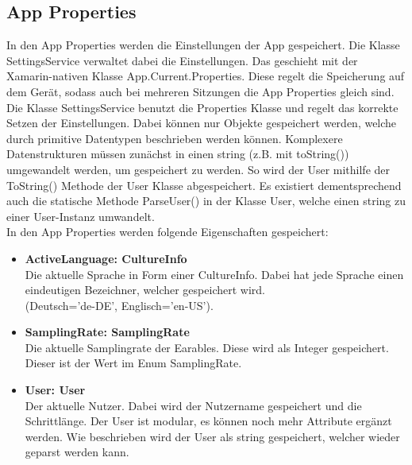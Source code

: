 \documentclass[a4paper,12pt]{article}
\begin{document}
\subsection{App Properties}
In den App Properties werden die Einstellungen der App gespeichert. Die Klasse SettingsService verwaltet dabei die Einstellungen. Das geschieht mit der Xamarin-nativen Klasse App.Current.Properties. Diese regelt die Speicherung auf dem Gerät, sodass auch bei mehreren Sitzungen die App Properties gleich sind.\\
Die Klasse SettingsService benutzt die Properties Klasse und regelt das korrekte Setzen der Einstellungen. Dabei können nur Objekte gespeichert werden, welche durch primitive Datentypen beschrieben werden können. Komplexere Datenstrukturen müssen zunächst in einen string (z.B. mit toString()) umgewandelt werden, um gespeichert zu werden. So wird der User mithilfe der ToString() Methode der User Klasse abgespeichert. Es existiert dementsprechend auch die statische Methode ParseUser() in der Klasse User, welche einen string zu einer User-Instanz umwandelt.
\\In den App Properties werden folgende Eigenschaften gespeichert:
\begin{itemize}
	\item \textbf{ActiveLanguage: CultureInfo}\\Die aktuelle Sprache in Form einer CultureInfo. Dabei hat jede Sprache einen eindeutigen Bezeichner, welcher gespeichert wird.\\ (Deutsch='de-DE', Englisch='en-US').
	\item \textbf{SamplingRate: SamplingRate}\\Die aktuelle Samplingrate der \Gls{Earables}. Diese wird als Integer gespeichert. Dieser ist der Wert im Enum SamplingRate.

	\item \textbf{User: User}\\Der aktuelle Nutzer. Dabei wird der Nutzername gespeichert und die Schrittlänge. Der User ist modular, es können noch mehr Attribute ergänzt werden.  Wie beschrieben wird der User als string gespeichert, welcher wieder geparst werden kann.

\end{itemize}
\end{document}
